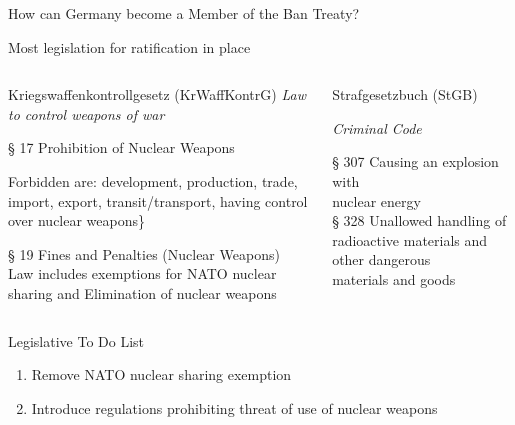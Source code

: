 \documentclass[presentation]{beamer}
\begin{document}
\begin{frame}[label={sec:org1a52512}]{How can Germany become a Member of the Ban Treaty?}
\end{frame}

\begin{frame}[label={sec:orgc51e450}]{Most legislation for ratification in place}
\begin{columns}[T]
\begin{column}{0.45\columnwidth}
\begin{block}{Kriegswaffenkontrollgesetz (KrWaffKontrG)}
\emph{Law to control weapons of war}

§ 17 Prohibition of Nuclear Weapons

\tiny Forbidden are: development, production, trade, import, export, transit/transport, having control over nuclear weapons\} \\[0.4em]

\scriptsize

§ 19 Fines and Penalties (Nuclear Weapons) \\[0.6em]

Law includes exemptions for 
NATO nuclear sharing and 
Elimination of nuclear weapons
\end{block}
\end{column}

\begin{column}{0.45\columnwidth}
\begin{block}{Strafgesetzbuch (StGB)}
\vspace{1.4em}

\emph{Criminal Code}

§ 307 Causing an explosion with \\ nuclear energy \\[0.4em]

§ 328 Unallowed handling of radioactive materials and other dangerous \\ materials and goods
\end{block}
\end{column}
\end{columns}

\vspace{0.8cm}

\begin{alertblock}{Legislative To Do List}
\begin{enumerate}
\item Remove NATO nuclear sharing exemption
\item Introduce regulations prohibiting threat of use of nuclear weapons
\end{enumerate}
\end{alertblock}
\end{frame}
\end{document}
